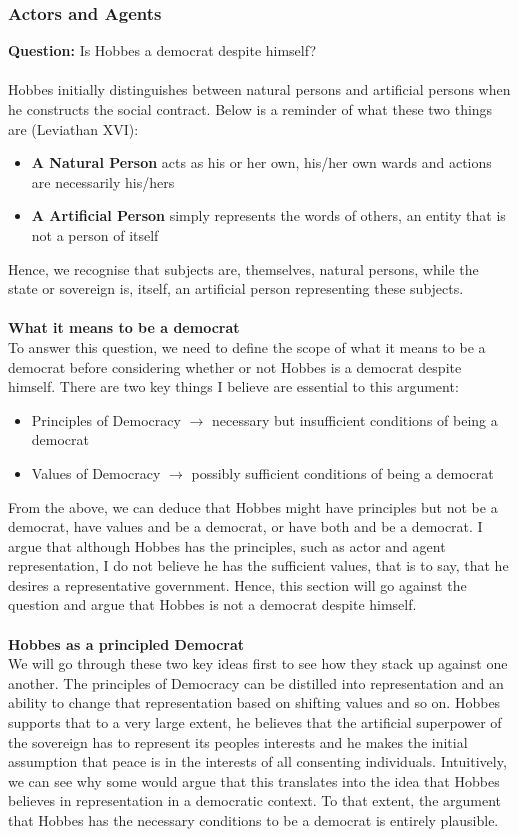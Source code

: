 \documentclass[12pt, letterpaper]{article}
\begin{document}
\subsubsection{Actors and Agents}
\textbf{Question:} Is Hobbes a democrat despite himself?\\\\
Hobbes initially distinguishes between natural persons and artificial persons when he constructs the social contract. Below is a reminder of what these two things are (Leviathan XVI):
\begin{itemize}
	\item \textbf{A Natural Person} acts as his or her own, his/her own wards and actions are necessarily his/hers
	\item \textbf{A Artificial Person} simply represents the words of others, an entity that is not a person of itself
\end{itemize}
Hence, we recognise that subjects are, themselves, natural persons, while the state or sovereign is, itself, an artificial person representing these subjects.\\\\
\textbf{What it means to be a democrat}\\
To answer this question, we need to define the scope of what it means to be a democrat before considering whether or not Hobbes is a democrat despite himself. There are two key things I believe are essential to this argument:
\begin{itemize}
	\item Principles of Democracy $\rightarrow$ necessary but insufficient conditions of being a democrat
	\item Values of Democracy $\rightarrow$ possibly sufficient conditions of being a democrat
\end{itemize}
From the above, we can deduce that Hobbes might have principles but not be a democrat, have values and be a democrat, or have both and be a democrat. I argue that although Hobbes has the principles, such as actor and agent representation, I do not believe he has the sufficient values, that is to say, that he desires a representative government. Hence, this section will go against the question and argue that Hobbes is not a democrat despite himself.\\\\
\textbf{Hobbes as a principled Democrat}\\
We will go through these two key ideas first to see how they stack up against one another. The principles of Democracy can be distilled into representation and an ability to change that representation based on shifting values and so on. Hobbes supports that to a very large extent, he believes that the artificial superpower of the sovereign has to represent its peoples interests and he makes the initial assumption that peace is in the interests of all consenting individuals. Intuitively, we can see why some would argue that this translates into the idea that Hobbes believes in representation in a democratic context. To that extent, the argument that Hobbes has the necessary conditions to be a democrat is entirely plausible.
\end{document}
